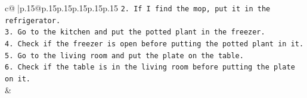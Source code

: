 \documentclass{article}
\begin{document}
{\begin{supertabular}{c@{$\;$}|p{.15\linewidth}@{}p{.15\linewidth}p{.15\linewidth}p{.15\linewidth}p{.15\linewidth}p{.15\linewidth}}
{{{\texttt{2. If I find the mop, put it in the refrigerator.} \\
\texttt{3. Go to the kitchen and put the potted plant in the freezer.} \\
\texttt{4. Check if the freezer is open before putting the potted plant in it.} \\
\texttt{5. Go to the living room and put the plate on the table.} \\
\texttt{6. Check if the table is in the living room before putting the plate on it.} \\
            }
        }
    }
    & \\ \\

\end{supertabular}
}
\end{document}
